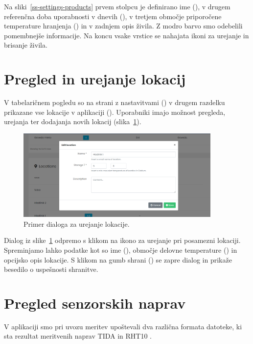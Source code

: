 \documentclass[a4paper, 12pt]{book}
\begin{document}
\clearpage

Na sliki~\ref{ss-settings-products} prvem stolpcu je definirano ime (), v drugem referenčna doba uporabnosti v dnevih (), v tretjem območje priporočene temperature hranjenja () in v zadnjem opis živila. Z modro barvo smo odebelili pomembnejše informacije. Na koncu vsake vrstice se nahajata ikoni za urejanje in brisanje živila. 


\section{Pregled in urejanje lokacij}

V tabelaričnem pogledu so na strani z nastavitvami () v drugem razdelku prikazane vse lokacije v aplikaciji (). Uporabniki imajo možnost pregleda, urejanja ter dodajanja novih lokacij (slika~\ref{ss-settings-location}).


\begin{figure}[h]
\begin{center}
\includegraphics[width=0.9\textwidth]{slike/location_edit.png}
\end{center}
\caption{Primer dialoga za urejanje lokacije.}
\label{ss-settings-location}
\end{figure}

Dialog iz slike~\ref{ss-settings-location} odpremo s klikom na ikono za urejanje pri posamezni lokaciji. Spreminjamo lahko podatke kot so ime (), območje delovne temperature () in opcijsko opis lokacije. S klikom na gumb shrani () se zapre dialog in prikaže besedilo o uspešnosti shranitve.


\clearpage


\section{Pregled senzorskih naprav}

V aplikaciji smo pri uvozu meritev upoštevali dva različna formata datoteke, ki sta rezultat meritvenih naprav TIDA \cite{tida-dialogger} in RHT10 \cite{rht10-dialogger}.
\end{document}
